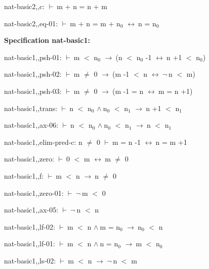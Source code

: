 \documentclass[a4paper]{article}
\newcommand{\Fol}{\mbox{$\vdash\ $}}
\newcommand{\Not}{\mbox{$\neg\ $}}
\newcommand{\And}{\mbox{$\wedge\ $}}
\newcommand{\Imp}{\mbox{$\rightarrow\ $}}
\newcommand{\Equiv}{\mbox{$\leftrightarrow\ $}}
\begin{document}
\bigskip

nat-basic2,,c: 
 \Fol m + n = n + m



\bigskip

nat-basic2,,eq-01: 
 \Fol m + n = m + $\mbox{n}_{0}$ \Equiv n = $\mbox{n}_{0}$



\bigskip

{\bf Specification nat-basic1:}

nat-basic1,,psh-01: 
 \Fol m $<$ $\mbox{n}_{0}$ \Imp (n $<$ $\mbox{n}_{0}$ -1 \Equiv n +1 $<$ $\mbox{n}_{0}$)



\bigskip

nat-basic1,,psh-02: 
 \Fol m $\neq$ 0 \Imp (m -1 $<$ n \Equiv \Not n $<$ m)



\bigskip

nat-basic1,,psh-03: 
 \Fol m $\neq$ 0 \Imp (m -1 = n \Equiv m = n +1)



\bigskip

nat-basic1,,trans: 
 \Fol n $<$ $\mbox{n}_{0}$ \And $\mbox{n}_{0}$ $<$ $\mbox{n}_{1}$ \Imp n +1 $<$ $\mbox{n}_{1}$



\bigskip

nat-basic1,,ax-06: 
 \Fol n $<$ $\mbox{n}_{0}$ \And $\mbox{n}_{0}$ $<$ $\mbox{n}_{1}$ \Imp n $<$ $\mbox{n}_{1}$



\bigskip

nat-basic1,,elim-pred-c: 
n $\neq$ 0
 \Fol m = n -1 \Equiv n = m +1



\bigskip

nat-basic1,,zero: 
 \Fol 0 $<$ m \Equiv m $\neq$ 0



\bigskip

nat-basic1,,f: 
 \Fol m $<$ n \Imp n $\neq$ 0



\bigskip

nat-basic1,,zero-01: 
 \Fol \Not m $<$ 0



\bigskip

nat-basic1,,ax-05: 
 \Fol \Not n $<$ n



\bigskip

nat-basic1,,lf-02: 
 \Fol m $<$ n \And m = $\mbox{n}_{0}$ \Imp $\mbox{n}_{0}$ $<$ n



\bigskip

nat-basic1,,lf-01: 
 \Fol m $<$ n \And n = $\mbox{n}_{0}$ \Imp m $<$ $\mbox{n}_{0}$



\bigskip

nat-basic1,,ls-02: 
 \Fol m $<$ n \Imp \Not n $<$ m



\bigskip
\end{document}
